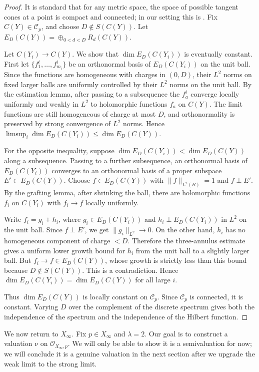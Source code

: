 \documentclass[11pt]{amsart}
\theoremstyle{definition}
\theoremstyle{remark}
\begin{document}
\begin{proof}
It is standard that for any metric space, the space of possible tangent cones at a
point is compact and connected; in our setting this is \cite[Lemma 3.2]{DSII}.
Fix $C(Y)\in\mathcal C_p$, and choose $D\notin S(C(Y))$. Let
$E_D(C(Y))=\oplus_{0<d<D}R_d(C(Y))$.

Let $C(Y_i)\rightarrow C(Y)$. We show that $\dim E_D(C(Y_i))$ is eventually
constant. First let $\{f^i_1,\dots,f^i_{m_i}\}$ be an orthonormal basis of
$E_D(C(Y_i))$ on the unit ball. Since the functions are homogeneous with charges
in $(0,D)$, their $L^2$ norms on fixed larger balls are uniformly controlled by
their $L^2$ norms on the unit ball. By the estimation lemma, after passing to a
subsequence the $f^i_a$ converge locally uniformly and weakly in $L^2$ to
holomorphic functions $f_a$ on $C(Y)$. The limit functions are still homogeneous
of charge at most $D$, and orthonormality is preserved by strong convergence of
$L^2$ norms. Hence $\limsup_i \dim E_D(C(Y_i))\leq \dim E_D(C(Y))$.

For the opposite inequality, suppose $\dim E_D(C(Y_i))<\dim E_D(C(Y))$ along a
subsequence. Passing to a further subsequence, an orthonormal basis of
$E_D(C(Y_i))$ converges to an orthonormal basis of a proper subspace
$E'\subset E_D(C(Y))$. Choose $f\in E_D(C(Y))$ with $\|f\|_{L^2(B)}=1$ and
$f\perp E'$. By the grafting lemma, after shrinking the ball, there are holomorphic
functions $f_i$ on $C(Y_i)$ with $f_i\rightarrow f$ locally uniformly.

Write $f_i=g_i+h_i$, where $g_i\in E_D(C(Y_i))$ and $h_i\perp E_D(C(Y_i))$ in
$L^2$ on the unit ball. Since $f\perp E'$, we get $\|g_i\|_{L^2}\rightarrow0$.
On the other hand, $h_i$ has no homogeneous component of charge $<D$. Therefore
the three-annulus estimate gives a uniform lower growth bound for $h_i$ from the
unit ball to a slightly larger ball. But $f_i\rightarrow f\in E_D(C(Y))$, whose
growth is strictly less than this bound because $D\notin S(C(Y))$. This is a
contradiction. Hence $\dim E_D(C(Y_i))=\dim E_D(C(Y))$ for all large $i$.

Thus $\dim E_D(C(Y))$ is locally constant on $\mathcal C_p$. Since
$\mathcal C_p$ is connected, it is constant. Varying $D$ over the complement of
the discrete spectrum gives both the independence of the spectrum and the
independence of the Hilbert function.
\end{proof}


We now return to $X_\infty$. Fix $p \in X_\infty$ and $\lambda=2$. Our goal
is to construct a valuation $\nu$ on $\mathcal O_{X_\infty,p}$. We will only be
able to show it is a semivaluation for now; we will conclude it is a genuine
valuation in the next section after we upgrade the weak limit to the strong limit.
\end{document}
